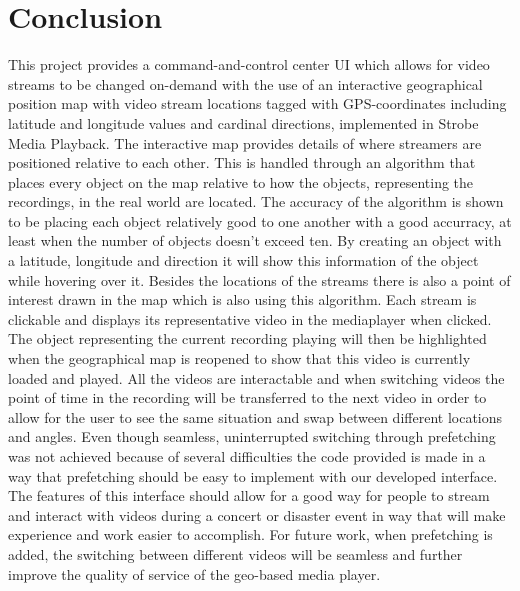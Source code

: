 \chapter{Conclusion}
\label{cha:conclusion}

This project provides a command-and-control center UI which allows for video streams to be changed on-demand with the use of an interactive geographical position map with video stream locations tagged with GPS-coordinates including latitude and longitude values and cardinal directions, implemented in Strobe Media Playback. The interactive map provides details of where streamers are positioned relative to each other. This is handled through an algorithm that places every object on the map relative to how the objects, representing the recordings, in the real world are located. The accuracy of the algorithm is shown to be placing each object relatively good to one another with a good accurracy, at least when the number of objects doesn’t exceed ten. By creating an object with a latitude, longitude and direction it will show this information of the object while hovering over it. Besides the locations of the streams there is also a point of interest drawn in the map which is also using this algorithm. Each stream is clickable and displays its representative video in the mediaplayer when clicked. The object representing the current recording playing will then be highlighted when the geographical map is reopened to show that this video is currently loaded and played. All the videos are interactable and when switching videos the point of time in the recording will be transferred to the next video in order to allow for the user to see the same situation and swap between different locations and angles. Even though seamless, uninterrupted switching through prefetching was not achieved because of several difficulties the code provided is made in a way that prefetching should be easy to implement with our developed interface. The features of this interface should allow for a good way for people to stream and interact with videos during a concert or disaster event in way that will make experience and work easier to accomplish. For future work, when prefetching is added, the switching between different videos will be seamless and further improve the quality of service of the geo-based media player.